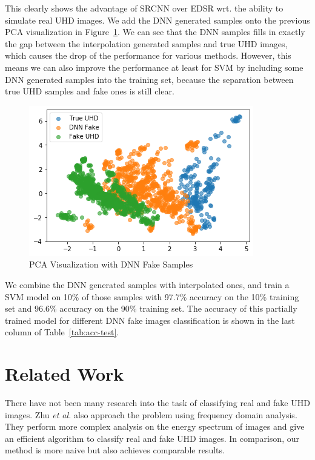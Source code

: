 \documentclass[journal,conference]{IEEEtran}
\begin{document}
This clearly shows the advantage of SRCNN over EDSR wrt. the ability to simulate real UHD images.
We add the DNN generated samples onto the previous PCA visualization in Figure~\ref{fig:pca-dnn}.
We can see that the DNN samples fills in exactly the gap between the interpolation generated samples and true UHD images, which causes the drop of the performance for various methods.
However, this means we can also improve the performance at least for SVM by including some DNN generated samples into the training set, because the separation between true UHD samples and fake ones is still clear.

\begin{figure}[h]
	\centering
	\includegraphics[width=0.95\linewidth]{fig/pca_dnn.png}
	\caption{PCA Visualization with DNN Fake Samples}
	\label{fig:pca-dnn}
\end{figure}

We combine the DNN generated samples with interpolated ones, and train a SVM model on 10\% of those samples with 97.7\% accuracy on the 10\% training set and 96.6\% accuracy on the 90\% training set.
The accuracy of this partially trained model for different DNN fake images classification is shown in the last column of Table~\ref{tab:acc-test}.

\section{Related Work}
There have not been many research into the task of classifying real and fake UHD images.
Zhu \textit{et al.} \cite{zhu2016distinguish} also approach the problem using frequency domain analysis.
They perform more complex analysis on the energy spectrum of images and give an efficient algorithm to classify real and fake UHD images.
In comparison, our method is more naive but also achieves comparable results.
\end{document}
